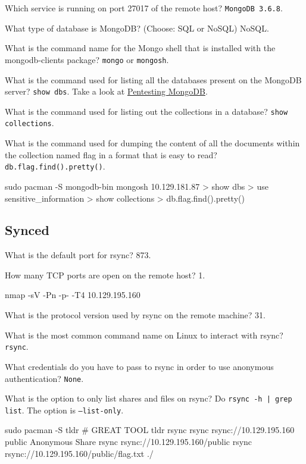 \documentclass[a4paper,10pt]{article}
\begin{document}
Which service is running on port 27017 of the remote host? \texttt{MongoDB 3.6.8}.

What type of database is MongoDB? (Choose: SQL or NoSQL) NoSQL.

What is the command name for the Mongo shell that is installed with the mongodb-clients package? \texttt{mongo} or \texttt{mongosh}.

What is the command used for listing all the databases present on the MongoDB server? \texttt{show dbs}. Take a look at \href{https://book.hacktricks.xyz/network-services-pentesting/27017-27018-mongodb}{Pentesting MongoDB}.

What is the command used for listing out the collections in a database? \texttt{show collections}.

What is the command used for dumping the content of all the documents within the collection named flag in a format that is easy to read? \texttt{db.flag.find().pretty()}.
\begin{bash}
sudo pacman -S mongodb-bin
mongosh 10.129.181.87
> show dbs
> use sensitive_information
> show collections
> db.flag.find().pretty()
\end{bash}

\subsection{Synced \faLinux}

What is the default port for rsync? 873.

How many TCP ports are open on the remote host? 1.
\begin{bash}
nmap -sV -Pn -p- -T4 10.129.195.160
\end{bash}

What is the protocol version used by rsync on the remote machine? 31.

What is the most common command name on Linux to interact with rsync? \texttt{rsync}.

What credentials do you have to pass to rsync in order to use anonymous authentication? \texttt{None}.

What is the option to only list shares and files on rsync? Do \texttt{rsync -h | grep list}. The option is \texttt{--list-only}.
\begin{bash}
sudo pacman -S tldr     # GREAT TOOL
tldr rsync
rsync rsync://10.129.195.160
public      Anonymous Share
rsync rsync://10.129.195.160/public
rsync rsync://10.129.195.160/public/flag.txt ./
\end{bash}
\end{document}

